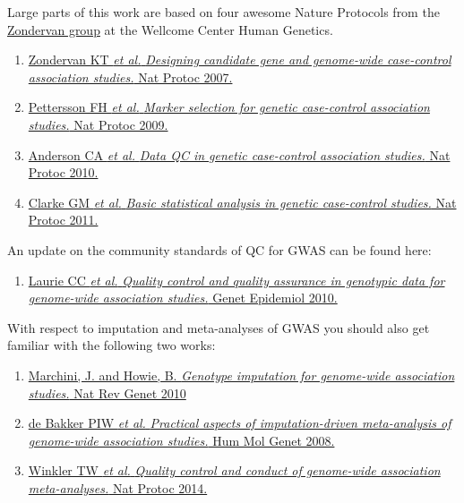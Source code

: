\documentclass[
]{book}
\providecommand{\tightlist}{%
  \setlength{\itemsep}{0pt}\setlength{\parskip}{0pt}}
\begin{document}
Large parts of this work are based on four awesome Nature Protocols from the \href{https://www.well.ox.ac.uk/research/research-groups/zondervan-group}{Zondervan group} at the Wellcome Center Human Genetics.

\begin{enumerate}
\def\labelenumi{\arabic{enumi}.}
\tightlist
\item
  \href{https://www.ncbi.nlm.nih.gov/pubmed/17947991}{Zondervan KT \emph{et al.} \emph{Designing candidate gene and genome-wide case-control association studies.} Nat Protoc 2007.}
\item
  \href{https://www.ncbi.nlm.nih.gov/pubmed/19390530}{Pettersson FH \emph{et al.} \emph{Marker selection for genetic case-control association studies.} Nat Protoc 2009.}
\item
  \href{https://www.ncbi.nlm.nih.gov/pubmed/21085122}{Anderson CA \emph{et al.} \emph{Data QC in genetic case-control association studies.} Nat Protoc 2010.}
\item
  \href{https://www.ncbi.nlm.nih.gov/pubmed/21293453}{Clarke GM \emph{et al.} \emph{Basic statistical analysis in genetic case-control studies.} Nat Protoc 2011.}
\end{enumerate}

An update on the community standards of QC for GWAS can be found here:

\begin{enumerate}
\def\labelenumi{\arabic{enumi}.}
\tightlist
\item
  \href{https://www.ncbi.nlm.nih.gov/pubmed/20718045}{Laurie CC \emph{et al.} \emph{Quality control and quality assurance in genotypic data for genome-wide association studies.} Genet Epidemiol 2010.}
\end{enumerate}

With respect to imputation and meta-analyses of GWAS you should also get familiar with the following two works:

\begin{enumerate}
\def\labelenumi{\arabic{enumi}.}
\tightlist
\item
  \href{https://doi.org/10.1038/nrg2796}{Marchini, J. and Howie, B. \emph{Genotype imputation for genome-wide association studies.} Nat Rev Genet 2010}
\item
  \href{https://www.ncbi.nlm.nih.gov/pubmed/18852200}{de Bakker PIW \emph{et al.} \emph{Practical aspects of imputation-driven meta-analysis of genome-wide association studies.} Hum Mol Genet 2008.}
\item
  \href{https://www.ncbi.nlm.nih.gov/pubmed/24762786}{Winkler TW \emph{et al.} \emph{Quality control and conduct of genome-wide association meta-analyses.} Nat Protoc 2014.}
\end{enumerate}
\end{document}
